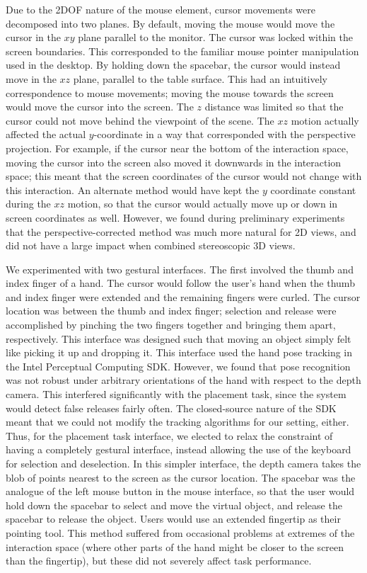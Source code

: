 \documentclass[pageno]{jpaper}
\begin{document}
Due to the 2DOF nature of the mouse element, cursor movements were decomposed into two planes.
By default, moving the mouse would move the cursor in the $xy$ plane parallel to the monitor.
The cursor was locked within the screen boundaries. This corresponded to the familiar mouse pointer
manipulation used in the desktop. By holding down the spacebar, the cursor would instead move in the
$xz$ plane, parallel to the table surface. This had an intuitively correspondence to mouse movements; moving
the mouse towards the screen would move the cursor into the screen. The $z$ distance was limited so that the
cursor could not move behind the viewpoint of the scene. The $xz$ motion actually affected the actual $y$-coordinate
in a way that corresponded with the perspective projection. For example, if the cursor near the bottom of the interaction
space, moving the cursor into the screen also moved it downwards in the interaction space; this meant that the screen
coordinates of the cursor would not change with this interaction. An alternate method would have kept the $y$ coordinate
constant during the $xz$ motion, so that the cursor would actually move up or down in screen coordinates as well. However,
we found during preliminary experiments that the perspective-corrected method was much more natural for 2D views, and did
not have a large impact when combined stereoscopic 3D views.

We experimented with two gestural interfaces. The first involved the thumb and index finger of a hand. The cursor would
follow the user's hand when the thumb and index finger were extended and the remaining fingers were curled. The cursor
location was between the thumb and index finger; selection and release were accomplished by pinching the two fingers
together and bringing them apart, respectively. This interface was designed such that moving an object simply felt like
picking it up and dropping it. This interface used the hand pose tracking in the Intel Perceptual Computing SDK. 
However, we found that pose recognition
was not robust under arbitrary orientations of the hand with respect to the depth camera. This interfered significantly with
the placement task, since the system would detect false releases fairly often. The closed-source nature of the SDK meant that
we could not modify the tracking algorithms for our setting, either. Thus, for the placement task interface, we elected to
relax the constraint of having a completely gestural interface, instead allowing the use of the keyboard for selection and
deselection. In this simpler interface, the depth camera takes the blob of points nearest to the screen as the cursor location.
The spacebar was the analogue of the left mouse button in the mouse interface, so that the user would hold down the spacebar
to select and move the virtual object, and release the spacebar to release the object. Users would use an extended fingertip as
their pointing tool. This method suffered from occasional problems at extremes of the interaction space (where other parts of the hand
might be closer to the screen than the fingertip), but these did not severely affect task performance. 
\end{document}
